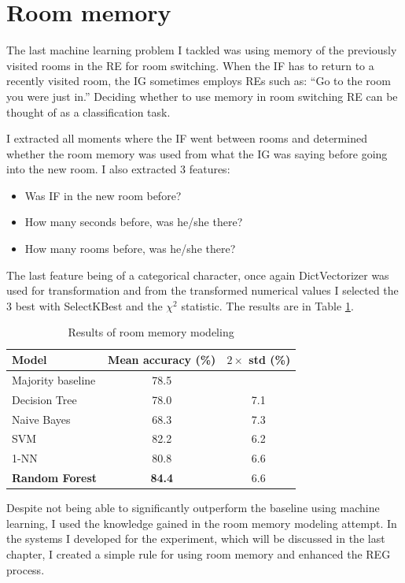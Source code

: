 \section{Room memory}
\label{sec:room-memory-ml}
The last machine learning problem I tackled was using memory of the previously visited rooms in the RE for room switching. When the IF has to return to a recently visited room, the IG sometimes employs REs such as: ``Go to the room you were just in.'' Deciding whether to use memory in room switching RE can be thought of as a classification task.

I extracted all moments where the IF went between rooms and determined whether the room memory was used from what the IG was saying before going into the new room. I also extracted 3 features:

\begin{itemize}
\item
Was IF in the new room before?
\item
How many seconds before, was he/she there?
\item
How many rooms before, was he/she there?
\end{itemize}

The last feature being of a categorical character, once again DictVectorizer was used for transformation and from the transformed numerical values I selected the 3 best with SelectKBest and the $\chi^2$ statistic. The results are in Table \ref{tab:history-ml}.

\begin{table}[!htbp]
 \centering
\begin{tabular}{lcc}
\toprule
Model    & Mean accuracy (\%) & $2\times$ std (\%) \\
\midrule
 Majority baseline    & 78.5	& \\
\midrule
 Decision Tree 	& 78.0	& 7.1 	\\
 Naive Bayes  	& 68.3	& 7.3	\\
 SVM 			& 82.2	& 6.2 	\\
 1-NN			& 80.8	& 6.6 	\\
 \textbf{Random Forest}	& \textbf{84.4}	& 6.6	\\
\bottomrule
\end{tabular}
\caption{Results of room memory modeling}
\label{tab:history-ml}
\end{table}

Despite not being able to significantly outperform the baseline using machine learning, I used the knowledge gained in the room memory modeling attempt. In the systems I developed for the experiment, which will be discussed in the last chapter, I created a simple rule for using room memory and enhanced the REG process.

